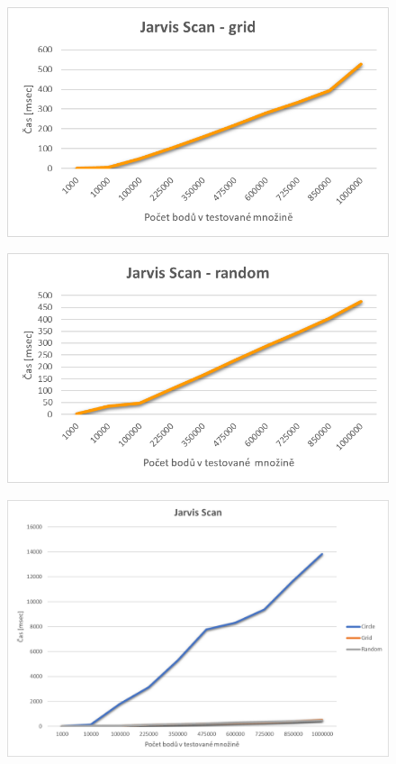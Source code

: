 \documentclass[a4paper, 12pt]{article}
\begin{document}
\begin{figure}[h!]
	\centering
	\includegraphics[width=15cm]{grafy/js_grid.png}
\end{figure}

\clearpage
\begin{figure}[h!]
	\centering
	\includegraphics[width=15cm]{grafy/js_random.png}
\end{figure}

\begin{figure}[h!]
	\centering
	\includegraphics[width=15cm]{grafy/js.png}
\end{figure}
\end{document}
